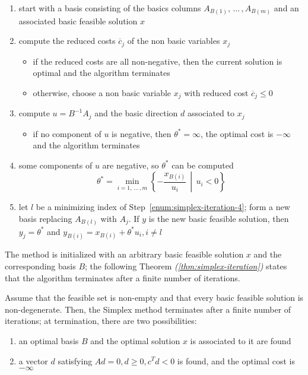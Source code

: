 \documentclass[english]{article}
\begin{document}
\begin{enumerate}[label=\arabic*., ref=(\arabic*)]
  \item \label{enum:simplex-iteration-1}start with a basis consisting of the basics columns \(A_{B(1)}, \, \ldots \,, A_{B(m)}\) and an associated basic feasible solution \(x\)
  \item \label{enum:simplex-iteration-2}compute the reduced costs \(\overline{c}_j\) of the non basic variables \(x_j\)
        \begin{itemize}[label=\(\rightarrow\)]
          \item if the reduced costs are all non-negative, then the current solution is optimal and the algorithm terminates
          \item otherwise, choose a non basic variable \(x_j\) with reduced cost \(\overline{c}_j \leq 0\)
        \end{itemize}
  \item \label{enum:simplex-iteration-3}compute \(u = B^{-1} A_j\) and the basic direction \(d\) associated to \(x_j\)
        \begin{itemize}[label=\(\rightarrow\)]
          \item if no component of \(u\) is negative, then \(\theta^\ast = \infty\), the optimal cost is \(-\infty\) and the algorithm terminates
        \end{itemize}
  \item \label{enum:simplex-iteration-4}some components of \(u\) are negative, so \(\theta^\ast\) can be computed
        \[ \theta^\ast = \min_{i=1, \, \ldots \,, m} \left\{ - \dfrac{x_{B(i)}}{u_i} \,\middle\vert\, u_i < 0 \right\} \]
  \item \label{enum:simplex-iteration-5}let \(l\) be a minimizing index of Step~\ref{enum:simplex-iteration-4}; form a new basis replacing \(A_{B(l)}\) with \(A_j\).
        If \(y\) is the new basic feasible solution, then \(y_j = \theta^\ast\) and \(y_{B(i)} = x_{B(i)} + \theta^\ast u_i, i \neq l\)
\end{enumerate}

\bigskip
The method is initialized with an arbitrary basic feasible solution \(x\) and the corresponding basis \(B\);
the following Theorem \textit{(\ref{thm:simplex-iteration})} states that the algorithm terminates after a finite number of iterations.

\begin{theorem}
  Assume that the feasible set is non-empty and that every basic feasible solution is non-degenerate.
  Then, the Simplex method terminates after a finite number of iterations;
  at termination, there are two possibilities:
  \begin{enumerate}
    \item an optimal basis \(B\) and the optimal solution \(x\) is associated to it are found
    \item a vector \(d\) satisfying \(Ad = 0, d \geq 0, c^T d < 0\) is found, and the optimal cost is \(-\infty\)
  \end{enumerate}
  \label{thm:simplex-iteration}
\end{theorem}
\end{document}

